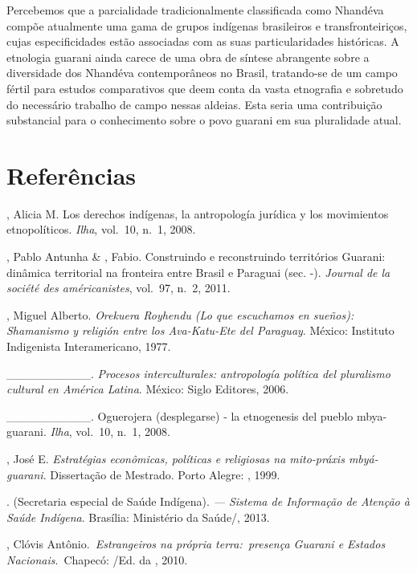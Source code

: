 {{%


Percebemos que a parcialidade tradicionalmente classificada como
Nhandéva compõe atualmente uma gama de grupos indígenas brasileiros e
transfronteiriços, cujas especificidades estão associadas com as suas
particularidades históricas. A etnologia guarani ainda carece de uma
obra de síntese abrangente sobre a diversidade dos Nhandéva
contemporâneos no Brasil, tratando-se de um campo fértil para estudos
comparativos que deem conta da vasta etnografia e sobretudo do
necessário trabalho de campo nessas aldeias. Esta seria uma
contribuição substancial para o conhecimento sobre o povo guarani em
sua pluralidade atual. 

\section{Referências}

\begin{Parskip}
, Alicia M. Los derechos indígenas, la antropología jurídica y
los movimientos etnopolíticos. \emph{Ilha}, vol.~10, n.~1, 2008.

, Pablo Antunha \& , Fabio. Construindo e reconstruindo
territórios Guarani: dinâmica territorial na fronteira entre Brasil e
Paraguai (sec. -). \emph{Journal de la société des américanistes}, vol.~97, n.~2,
2011. 

, Miguel Alberto. \emph{Orekuera Royhendu (Lo que escuchamos en
sueños): Shamanismo y religión entre los Ava-Katu-Ete del Paraguay}.
México: Instituto Indigenista Interamericano, 1977.

\_\_\_\_\_\_\_\_\_\_. \emph{Procesos interculturales: antropología política
del pluralismo cultural en América Latina}. México: Siglo  Editores,
2006.

\_\_\_\_\_\_\_\_\_\_. Oguerojera (desplegarse) - la etnogenesis del
pueblo mbya-guarani. \emph{Ilha}, vol.~10, n.~1, 2008.

 , José E. \emph{Estratégias econômicas, políticas e religiosas
na mito-práxis mbyá-guarani}. Dissertação de Mestrado. Porto Alegre:
, 1999.

.  (Secretaria especial de Saúde Indígena). \emph{ — Sistema
de Informação de Atenção à Saúde Indígena}. Brasília: Ministério da
Saúde/, 2013.

, Clóvis Antônio.\emph{~Estrangeiros na própria terra:~presença
Guarani e Estados Nacionais}.~Chapecó: /Ed. da , 2010. 


\end{Parskip}}}
